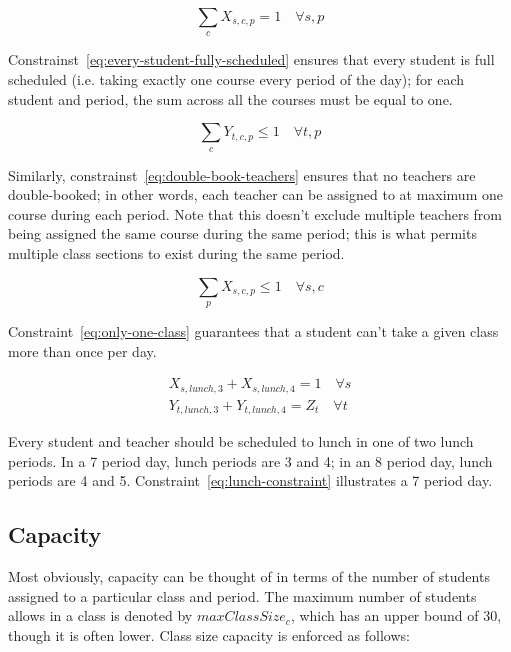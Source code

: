 \documentclass[12pt]{article}
\begin{document}
\begin{equation} \label{eq:every-student-fully-scheduled}
	\displaystyle \sum_{c} X_{s,c,p} = 1 \quad \forall s,p
\end{equation}

Constrainst~\ref{eq:every-student-fully-scheduled} ensures that every student is full scheduled (i.e. taking exactly one course every period of the day); for each student and period, the sum across all the courses must be equal to one.

\begin{equation} \label{eq:double-book-teachers}
	\displaystyle \sum_{c} Y_{t,c,p} \leq 1 \quad \forall t,p
\end{equation}

Similarly, constrainst~\ref{eq:double-book-teachers} ensures that no teachers are double-booked; in other words, each teacher can be assigned to at maximum one course during each period. Note that this doesn't exclude multiple teachers from being assigned the same course during the same period; this is what permits multiple class sections to exist during the same period.

\begin{equation} \label{eq:only-one-class}
	\displaystyle \sum_{p} X_{s,c,p} \leq 1 \quad \forall s,c
\end{equation}

Constraint~\ref{eq:only-one-class} guarantees that a student can't take a given class more than once per day.

\begin{equation} \label{eq:lunch-constraint}
\begin{split}
	X_{s,lunch,3} + X_{s,lunch,4} = 1 \quad \forall s \\
	Y_{t,lunch,3} + Y_{t,lunch,4} = Z_{t} \quad \forall t
\end{split}
\end{equation}

Every student and teacher should be scheduled to lunch in one of two lunch periods. In a 7 period day, lunch periods are 3 and 4; in an 8 period day, lunch periods are 4 and 5. Constraint~\ref{eq:lunch-constraint} illustrates a 7 period day.


\subsection{Capacity}

Most obviously, capacity can be thought of in terms of the number of students assigned to a particular class and period. The maximum number of students allows in a class is denoted by $maxClassSize_{c}$, which has an upper bound of 30, though it is often lower. Class size capacity is enforced as follows:
\end{document}
